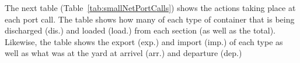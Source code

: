 The next table (Table~\ref{tab:smallNetPortCalls}) shows the actions taking place at each port call. The table shows how many of each type of container that is being discharged (dis.) and loaded (load.) from each section (as well as the total). Likewise, the table shows the export (exp.) and import (imp.) of each type as well as what was at the yard at arrivel (arr.) and departure (dep.)


